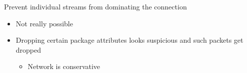 \begin{itemize}
\begin{itemize}
\begin{itemize}
                         Prevent individual streams from dominating the connection
                \end{itemize}
                \begin{itemize}
                    \item Not really possible
                    \item Dropping certain package attributes looks suspicious and such packets get dropped
                        \begin{itemize}
                            \item Network is conservative
                        \end{itemize}
                \end{itemize}
        \end{itemize}
\end{itemize}

